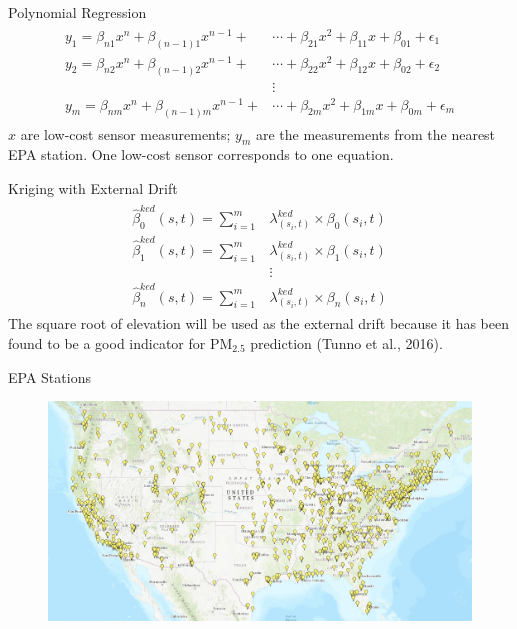 \documentclass[handout]{beamer} %
\begin{document}
\begin{frame}{Polynomial Regression}
    \begin{align*}
        \begin{split}
        y_1=\beta_{n1}x^n+\beta_{(n-1)1}x^{n-1}+&\cdots+\beta_{21}x^2+\beta_{11}x+\beta_{01} + \epsilon_1 \\
        y_2=\beta_{n2}x^n+\beta_{(n-1)2}x^{n-1}+&\cdots+\beta_{22}x^2+\beta_{12}x+\beta_{02} + \epsilon_2 \\
        &\vdots \\
        y_m=\beta_{nm}x^n+\beta_{(n-1)m}x^{n-1}+&\cdots+\beta_{2m}x^2+\beta_{1m}x+\beta_{0m} + \epsilon_m
        \end{split}
    \end{align*}
    \textcolor[rgb]{0.1,0.1,0.6}{$x$ are low-cost sensor measurements; $y_m$ are the measurements from the nearest EPA station. One low-cost sensor corresponds to one equation.}
\end{frame}

\begin{frame}{Kriging with External Drift}
    \begin{align*}
        \begin{split}
        \hat{\beta}^{ked}_0(s,t)=\sum_{i=1}^m&\lambda^{ked}_{(s_i,t)}\times\beta_0(s_i,t) \\
        \hat{\beta}^{ked}_1(s,t)=\sum_{i=1}^m&\lambda^{ked}_{(s_i,t)}\times\beta_1(s_i,t) \\
        &\vdots \\
        \hat{\beta}^{ked}_n(s,t)=\sum_{i=1}^m&\lambda^{ked}_{(s_i,t)}\times\beta_n(s_i,t) 
        \end{split}
    \end{align*}
    \textcolor[rgb]{0.1,0.1,0.6}{The square root of elevation will be used as the external drift because it has been found to be a good indicator for PM$_{2.5}$ prediction (Tunno et al., 2016).}
\end{frame}

\begin{frame}{EPA Stations}
    \begin{figure}
        \centering
        \includegraphics[width=\textwidth]{img/appendix/Stations/epa.jpg}
    \end{figure}
\end{frame}
\end{document}
